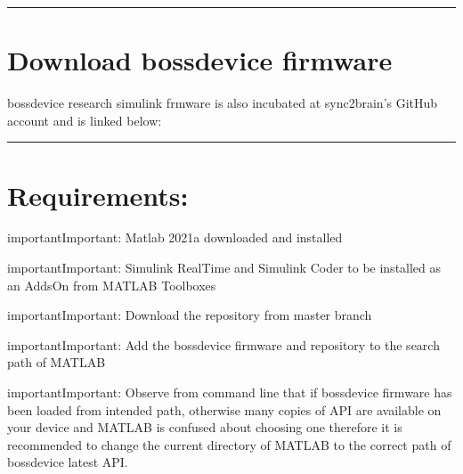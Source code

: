 \documentclass[letterpaper,10pt,english]{sphinxmanual}
\begin{document}
\bigskip\hrule\bigskip



\section{Download bossdevice firmware}
\label{\detokenize{6_downloads_n_dependencies:download-bossdevice-firmware}}
\sphinxAtStartPar
bossdevice research simulink frmware is also incubated at sync2brain’s GitHub account and is linked below:

\begin{sphinxVerbatim}[commandchars=\\\{\}]
\end{sphinxVerbatim}


\bigskip\hrule\bigskip



\section{Requirements:}
\label{\detokenize{6_downloads_n_dependencies:requirements}}
\begin{sphinxadmonition}{important}{Important:}
\sphinxAtStartPar
Matlab 2021a downloaded and installed
\end{sphinxadmonition}

\begin{sphinxadmonition}{important}{Important:}
\sphinxAtStartPar
Simulink Real\sphinxhyphen{}Time and Simulink Coder to be installed as an Adds\sphinxhyphen{}On from MATLAB Toolboxes
\end{sphinxadmonition}

\begin{sphinxadmonition}{important}{Important:}
\sphinxAtStartPar
Download the repository from master branch
\end{sphinxadmonition}

\begin{sphinxadmonition}{important}{Important:}
\sphinxAtStartPar
Add the bossdevice firmware and repository to the search path of MATLAB
\end{sphinxadmonition}

\begin{sphinxadmonition}{important}{Important:}
\sphinxAtStartPar
Observe from command line that if bossdevice firmware has been loaded from intended path, otherwise many copies of API are available on your device and MATLAB is confused about choosing one therefore it is recommended to change the current directory of MATLAB to the correct path of bossdevice latest API.
\end{sphinxadmonition}
\end{document}
